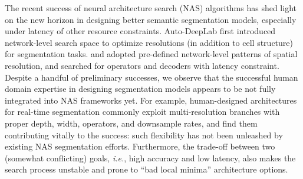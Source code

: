 \documentclass{article} \usepackage{iclr2020_conference,times}
\begin{document}
The recent success of neural architecture search (NAS) algorithms has shed light on the new horizon in designing better semantic segmentation models, especially under latency of other resource constraints. Auto-DeepLab \citep{liu2019auto} first introduced network-level search space to optimize resolutions (in addition to cell structure) for segmentation tasks. \citet{zhang2019customizable} and \citet{li2019partial} adopted pre-defined network-level patterns of spatial resolution, and searched for operators and decoders with latency constraint. Despite a handful of preliminary successes, we observe that the successful human domain expertise in designing segmentation models appears to be not fully integrated into NAS frameworks yet. For example, human-designed architectures for real-time segmentation \citep{zhao2018icnet,yu2018bisenet} commonly exploit multi-resolution branches with proper depth, width, operators, and downsample rates, and find them contributing vitally to the success: such flexibility has not been unleashed by existing NAS segmentation efforts. Furthermore, the trade-off between two (somewhat conflicting) goals, \textit{i.e.}, high accuracy and low latency, also makes the search process unstable and prone to ``bad local minima'' architecture options. 
\end{document}
